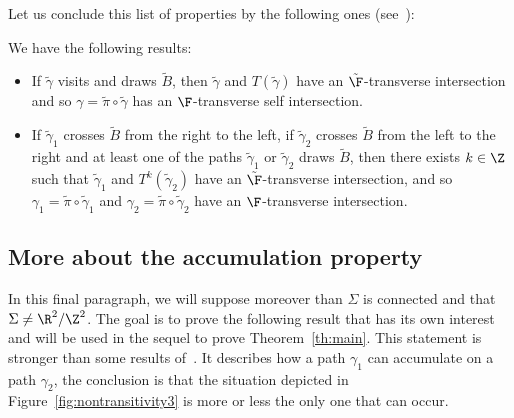 Let us conclude this list of properties by the following ones (see~\cite[Section~2.1.2.c]{Lel}):


\begin{prop}\label{prop:transversestrips}
We have the following results:
\begin{itemize}
\item If $\tilde\gamma$ visits and draws $\tilde B$, then $\tilde\gamma$ and $T(\tilde\gamma)$ have an $\tilde{\F}$-transverse intersection and so $\gamma=\tilde\pi\circ\tilde\gamma$ has an $\F$-transverse self intersection.

\item If $\tilde\gamma_1$ crosses $\tilde B$ from the right to the left, if $\tilde\gamma_2$ crosses $\tilde B$ from the left to the right and at least one of the paths $\tilde\gamma_1$ or $\tilde\gamma_2$ draws $\tilde B$, then there exists $k\in \Z$ such that $\tilde\gamma_1$ and $T^k(\tilde\gamma_2)$ have an $\tilde{\F}$-transverse intersection, and so $\gamma_1=\tilde\pi\circ\tilde\gamma_1$ and $\gamma_2=\tilde\pi\circ\tilde\gamma_2$ have an $\F$-transverse intersection.
\end{itemize}
\end{prop}



\subsection{More about the accumulation property}


In this final paragraph, we will suppose moreover than $\Sigma$ is connected and that $\Sigma\not=\R^2/\Z^2$. The goal is to prove the following result that has its own interest and will be used in the sequel to prove Theorem~\ref{th:main}. This statement is stronger than some results of~\cite[Section~2.1.1]{Lel}. It describes how a path $\gamma_1$ can accumulate on a path $\gamma_2$, the conclusion is that the situation depicted in Figure~\ref{fig:nontransitivity3} is more or less the only one that can occur.

